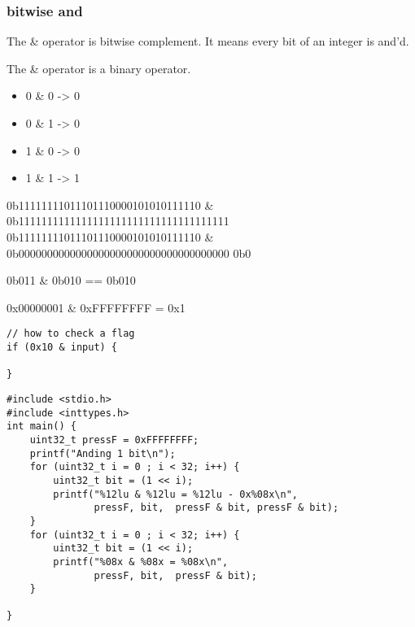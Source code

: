 \documentclass[11pt]{article}
\begin{document}
\subsubsection{bitwise and}
\label{sec:orgf9bdebe}

The \& operator is bitwise complement. It means every bit of an integer
is and'd. 

The \& operator is a binary operator.

\begin{itemize}
\item 0 \& 0 -> 0
\item 0 \& 1 -> 0
\item 1 \& 0 -> 0
\item 1 \& 1 -> 1
\end{itemize}

0b11111111011101110000101010111110 \& 0b1111111111111111111111111111111111111
0b11111111011101110000101010111110 \& 0b0000000000000000000000000000000000000
0b0

0b011 \& 0b010 == 0b010

0x00000001 \& 0xFFFFFFFF = 0x1

\begin{verbatim}
// how to check a flag
if (0x10 & input) {

}
\end{verbatim}

\begin{verbatim}
#include <stdio.h>
#include <inttypes.h>
int main() {  
    uint32_t pressF = 0xFFFFFFFF;
    printf("Anding 1 bit\n");
    for (uint32_t i = 0 ; i < 32; i++) {
        uint32_t bit = (1 << i);
        printf("%12lu & %12lu = %12lu - 0x%08x\n",  
               pressF, bit,  pressF & bit, pressF & bit);
    }
    for (uint32_t i = 0 ; i < 32; i++) {
        uint32_t bit = (1 << i);
        printf("%08x & %08x = %08x\n",
               pressF, bit,  pressF & bit);
    }

}
\end{verbatim}
\end{document}
